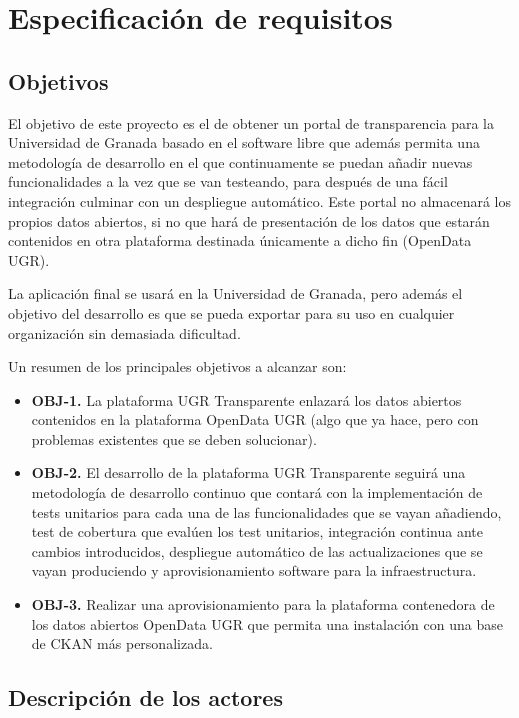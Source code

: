 \chapter{Especificación de requisitos}

\section{Objetivos}

El objetivo de este proyecto es el de obtener un portal de transparencia para la Universidad de Granada basado en el software 
libre que además permita una metodología de desarrollo en el que continuamente se puedan añadir nuevas funcionalidades a la 
vez que se van testeando, para después de una fácil integración culminar con un despliegue automático. Este portal no almacenará
los propios datos abiertos, si no que hará de presentación de los datos que estarán contenidos en otra plataforma destinada 
únicamente a dicho fin (OpenData UGR).

\bigskip
La aplicación final se usará en la Universidad de Granada, pero además el objetivo del desarrollo es que se pueda exportar 
para su uso en cualquier organización sin demasiada dificultad.

\bigskip
Un resumen de los principales objetivos a alcanzar son:

\begin{itemize}
  \item \textbf{OBJ-1.} La plataforma UGR Transparente enlazará los datos abiertos contenidos en la plataforma OpenData UGR
  (algo que ya hace, pero con problemas existentes que se deben solucionar).
  \item \textbf{OBJ-2.} El desarrollo de la plataforma UGR Transparente seguirá una metodología de desarrollo continuo que 
  contará con la implementación de tests unitarios para cada una de las funcionalidades que se vayan añadiendo, test de 
  cobertura que evalúen los test unitarios, integración continua ante cambios introducidos, despliegue automático de las
  actualizaciones que se vayan produciendo y aprovisionamiento software para la infraestructura.
  \item \textbf{OBJ-3.} Realizar una aprovisionamiento para la plataforma contenedora de los datos abiertos OpenData UGR que 
  permita una instalación con una base de CKAN más personalizada.
\end{itemize}
  
\section{Descripción de los actores}

